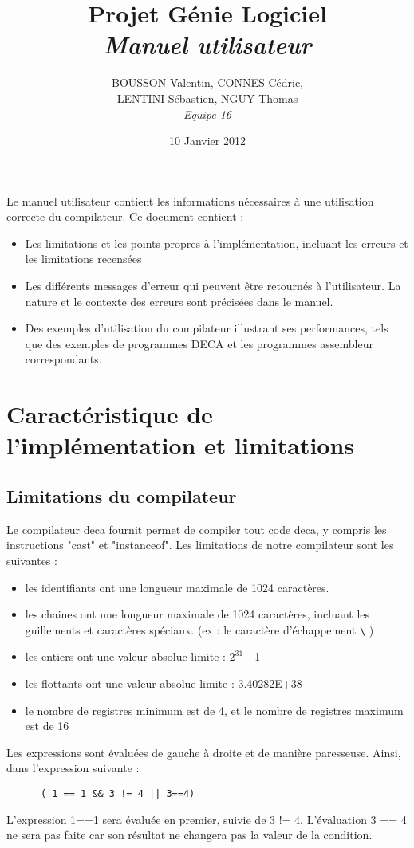 \documentclass[11pt]{article}
\title{Projet Génie Logiciel\\\emph{Manuel utilisateur}}
\author{BOUSSON Valentin, CONNES Cédric,\\LENTINI Sébastien, NGUY Thomas\\\emph{Equipe 16}}
\date{10 Janvier 2012}
\begin{document}
\maketitle
Le manuel utilisateur contient les informations nécessaires à une utilisation correcte du compilateur. Ce document contient :
\begin{itemize}
\item Les limitations et les points propres à l'implémentation, incluant les erreurs et les limitations recensées
\item Les différents messages d'erreur qui peuvent être retournés à l'utilisateur. La nature et le contexte des erreurs sont précisées dans le manuel.
\item Des exemples d'utilisation du compilateur illustrant ses performances, tels que des exemples de programmes DECA et les programmes assembleur correspondants. 
\end{itemize} 

   \section{Caractéristique de l'implémentation et limitations}

   \subsection{Limitations du compilateur}

   Le compilateur deca fournit permet de compiler tout code deca, y compris les instructions "cast" et "instanceof".
   Les limitations de notre compilateur sont les suivantes :
   \begin{itemize}
      \item les identifiants ont une longueur maximale de 1024 caractères.
      \item les chaines ont une longueur maximale de 1024 caractères, incluant les guillements et caractères spéciaux. (ex : le caractère d'échappement \verb!\! )
      \item les entiers ont une valeur absolue limite : $2^{31}$ - 1
      \item les flottants ont une valeur absolue limite : 3.40282E+38
      \item le nombre de registres minimum est de 4, et le nombre de registres maximum est de 16
   \end{itemize}

   Les expressions sont évaluées de gauche à droite et de manière paresseuse. Ainsi, dans l'expression suivante :
     \lstset{language=Java}
    \begin{lstlisting}
      ( 1 == 1 && 3 != 4 || 3==4)
    \end{lstlisting}
   L'expression 1==1 sera évaluée en premier, suivie de 3 != 4. L'évaluation 3 == 4 ne sera pas faite car son résultat ne changera pas la valeur de la condition.
   
\end{document}
